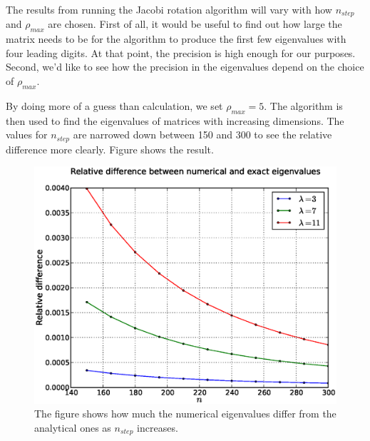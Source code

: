 The results from running the Jacobi rotation algorithm will vary with how 
$n_{step}$ and $\rho_{max}$ are chosen. First of all, it would be useful to find
out how large the matrix needs to be for the algorithm to produce the first few
eigenvalues with four leading digits. At that point, the precision is high
enough for our purposes. Second, we'd like to see how the precision in the
eigenvalues depend on the choice of $\rho_{max}$. 

By doing more of a guess than calculation, we set $\rho_{max} = 5$. The
algorithm is then used to find the eigenvalues of matrices with increasing
dimensions. The values for $n_{step}$ are narrowed down between 150 and 300 to
see the relative difference more clearly. Figure  shows the result.
%
\begin{figure}[htpb]
\centering
\includegraphics[width=1.0\textwidth]{images/nreldiff2.eps}
\caption{The figure shows how much the numerical eigenvalues differ from the analytical
	ones as $n_{step}$ increases.}
\label{fig:nreldiff}
\end{figure}
%





